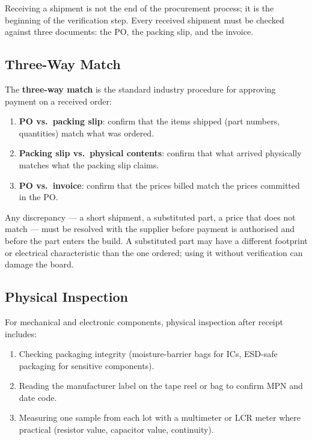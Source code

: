 Receiving a shipment is not the end of the procurement process; it is the
beginning of the verification step.
Every received shipment must be checked against three documents: the PO, the
packing slip, and the invoice.

\subsection{Three-Way Match}
\label{sec:ch11-3way}

The \textbf{three-way match} is the standard industry
procedure for approving payment on a received order:

\begin{enumerate}
  \item[(a)] \textbf{PO vs.\ packing slip}: confirm that the items shipped
        (part numbers, quantities) match what was ordered.
  \item[(b)] \textbf{Packing slip vs.\ physical contents}: confirm that what
        arrived physically matches what the packing slip claims.
  \item[(c)] \textbf{PO vs.\ invoice}: confirm that the prices billed match the
        prices committed in the PO.
\end{enumerate}

Any discrepancy --- a short shipment, a substituted part, a price that does not
match --- must be resolved with the supplier before payment is authorised and
before the part enters the build.
A substituted part may have a different footprint or electrical characteristic
than the one ordered; using it without verification can damage the board.

\subsection{Physical Inspection}
\label{sec:ch11-inspection}

For mechanical and electronic components, physical inspection after receipt
includes:

\begin{enumerate}
  \item[(a)] Checking packaging integrity (moisture-barrier bags for ICs,
        ESD-safe packaging for sensitive components).
  \item[(b)] Reading the manufacturer label on the tape reel or bag to confirm
        MPN and date code.
  \item[(c)] Measuring one sample from each lot with a multimeter or LCR meter
        where practical (resistor value, capacitor value, continuity).
\end{enumerate}

